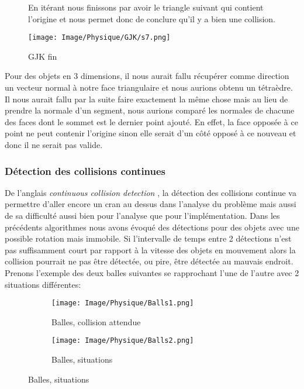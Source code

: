 \begin{figure}[h!]
	\begin{minipage}{0.55\linewidth}
		En itérant nous finissons par avoir le triangle suivant qui contient l'origine et nous permet donc de conclure qu'il y a bien une collision.
	\end{minipage}
	\hfill
	\begin{minipage}{0.45\linewidth}
		\texttt{[image: Image/Physique/GJK/s7.png]}
		\caption{GJK fin}
		\label{fig:GJK fin}
	\end{minipage}	
\end{figure}

\noindent Pour des objets en 3 dimensions, il nous aurait fallu récupérer comme direction un vecteur normal à notre face triangulaire et nous aurions obtenu un tétraèdre. Il nous aurait fallu par la suite faire exactement la même chose mais au lieu de prendre la normale d'un segment, nous aurions comparé les normales de chacune des faces dont le sommet est le dernier point ajouté. En effet, la face opposée à ce point ne peut contenir l'origine sinon elle serait d'un côté opposé à ce nouveau et donc il ne serait pas valide.

\pagebreak
\subsubsection{Détection des collisions continues}
De l'anglais \textit{continuous collision detection} \citep{Multiple}, la détection des collisions continue va permettre d'aller encore un cran au dessus dans l'analyse du problème mais aussi de sa difficulté aussi bien pour l'analyse que pour l'implémentation. Dans les précédents algorithmes nous avons évoqué des détections pour des objets avec une possible rotation mais immobile. Si l'intervalle de temps entre 2 détections n'est pas suffisamment court par rapport à la vitesse des objets en mouvement alors la collision pourrait ne pas être détectée, ou pire, être détectée au mauvais endroit.\\

Prenons l'exemple des deux balles suivantes se rapprochant l'une de l'autre avec 2 situations différentes: 

\begin{figure}[h!]
	\begin{subfigure}{0.4\linewidth}
		\texttt{[image: Image/Physique/Balls1.png]}
		\caption{Balles, collision attendue}
		\label{fig:Balles, collision attendue}
	\end{subfigure}
	\hfill
	\begin{subfigure}{0.4\linewidth}
		\texttt{[image: Image/Physique/Balls2.png]}
		\caption{Balles, situations}
		\label{fig:Balles, situations}
	\end{subfigure}
\end{figure}

